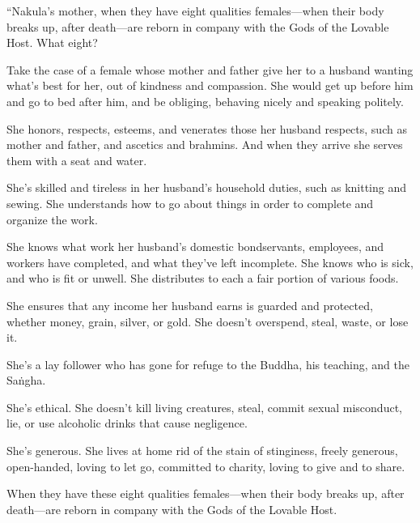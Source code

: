 \documentclass[12pt,openany]{book}%
\begin{document}
“Nakula’s mother, when they have eight qualities females—when their body breaks up, after death—are reborn in company with the Gods of the Lovable Host. What eight? 

Take the case of a female whose mother and father give her to a husband wanting what’s best for her, out of kindness and compassion. She would get up before him and go to bed after him, and be obliging, behaving nicely and speaking politely. 

She honors, respects, esteems, and venerates those her husband respects, such as mother and father, and ascetics and brahmins. And when they arrive she serves them with a seat and water. 

She’s skilled and tireless in her husband’s household duties, such as knitting and sewing. She understands how to go about things in order to complete and organize the work. 

She knows what work her husband’s domestic bondservants, employees, and workers have completed, and what they’ve left incomplete. She knows who is sick, and who is fit or unwell. She distributes to each a fair portion of various foods. 

She ensures that any income her husband earns is guarded and protected, whether money, grain, silver, or gold. She doesn’t overspend, steal, waste, or lose it. 

She’s a lay follower who has gone for refuge to the Buddha, his teaching, and the \textsanskrit{Saṅgha}. 

She’s ethical. She doesn’t kill living creatures, steal, commit sexual misconduct, lie, or use alcoholic drinks that cause negligence. 

She’s generous. She lives at home rid of the stain of stinginess, freely generous, open-handed, loving to let go, committed to charity, loving to give and to share. 

When they have these eight qualities females—when their body breaks up, after death—are reborn in company with the Gods of the Lovable Host. 
\end{document}
